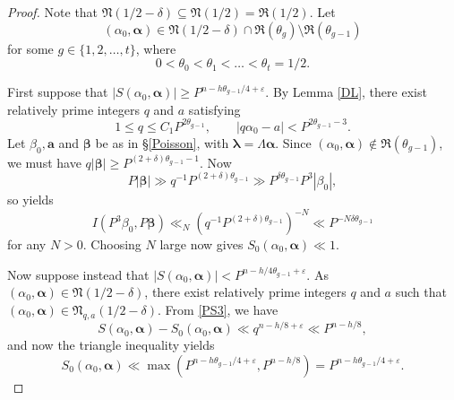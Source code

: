 \documentclass[12pt,reqno]{amsart}
\theoremstyle{definition}
\theoremstyle{remark}
\numberwithin{equation}{section}
\begin{document}
\begin{proof}
Note that ${\mathfrak N}(1/2-{{\delta}}) \subseteq {\mathfrak N}(1/2) = {\mathfrak R}(1/2)$. Let 
\[
({{\alpha}}_0,{\boldsymbol{{\alpha}}}) \in {\mathfrak N}(1/2 - {{\delta}}) \cap {\mathfrak R}({{\theta}}_g) \setminus {\mathfrak R}({{\theta}}_{g-1})
\]
for some $g \in \{1,2,\ldots,t\}$, where
\[
0 < {{\theta}}_0 < {{\theta}}_1 < \ldots < {{\theta}}_t = 1/2.
\]

First suppose that $|S({{\alpha}}_0,{\boldsymbol{{\alpha}}})| {\geqslant} P^{n-h {{\theta}}_{g-1}/4 + {\varepsilon}}$. By Lemma \ref{DL}, there exist relatively prime integers $q$ and $a$ satisfying
\[
1 {\leqslant} q {\leqslant} C_1 P^{2 {{\theta}}_{g-1}}, \qquad |q {{\alpha}}_0 - a| < P^{2 {{\theta}}_{g-1} - 3}.
\]
Let ${{\beta}}_0, {\mathbf a}$ and ${\boldsymbol{\beta}}$ be as in \S \ref{Poisson}, with ${{\boldsymbol {{\lambda}}}} = {{\Lambda}} {\boldsymbol{{\alpha}}}$. Since $({{\alpha}}_0,{\boldsymbol{{\alpha}}}) \notin {\mathfrak R}({{\theta}}_{g-1})$, we must have $q |{\boldsymbol{\beta}}| {\geqslant} P^{(2+{{\delta}}){{\theta}}_{g-1} - 1}$. Now
\[
P|{\boldsymbol{\beta}}| \gg q^{-1} P^{(2+{{\delta}}) {{\theta}}_{g-1}} \gg P^{{{\delta}} {{\theta}}_{g-1}} P^3|{{\beta}}_0|,
\]
so \cite[Lemma 10]{HB1996} yields
\[
I(P^3 {{\beta}}_0, P {\boldsymbol{\beta}}) \ll_N (q^{-1} P^{(2+{{\delta}}) {{\theta}}_{g-1}} )^{-N} \ll P^{-N {{\delta}} {{\theta}}_{g-1}}
\]
for any $N > 0$. Choosing $N$ large now gives $S_0({{\alpha}}_0, {\boldsymbol{{\alpha}}}) \ll 1$.

Now suppose instead that $|S({{\alpha}}_0,{\boldsymbol{{\alpha}}})| < P^{n-h/4 {{\theta}}_{g-1} + {\varepsilon}}$. As \mbox{$({{\alpha}}_0,{\boldsymbol{{\alpha}}}) \in {\mathfrak N}(1/2 - {{\delta}})$}, there exist relatively prime integers $q$ and $a$ such that \mbox{$({{\alpha}}_0,{\boldsymbol{{\alpha}}}) \in {\mathfrak N}_{q,a}(1/2 - {{\delta}})$}. From \eqref{PS3}, we have
\[
S({{\alpha}}_0,{\boldsymbol{{\alpha}}}) - S_0({{\alpha}}_0,{\boldsymbol{{\alpha}}}) \ll q^{n-h/8 + {\varepsilon}} \ll P^{n-h/8},
\]
and now the triangle inequality yields
\begin{equation} \label{S0bound}
S_0({{\alpha}}_0,{\boldsymbol{{\alpha}}}) \ll \max(P^{n-h {{\theta}}_{g-1} /4 + {\varepsilon}},  P^{n-h/8}) = P^{n-h {{\theta}}_{g-1} /4 + {\varepsilon}}.
\end{equation}


\end{proof}
\end{document}
